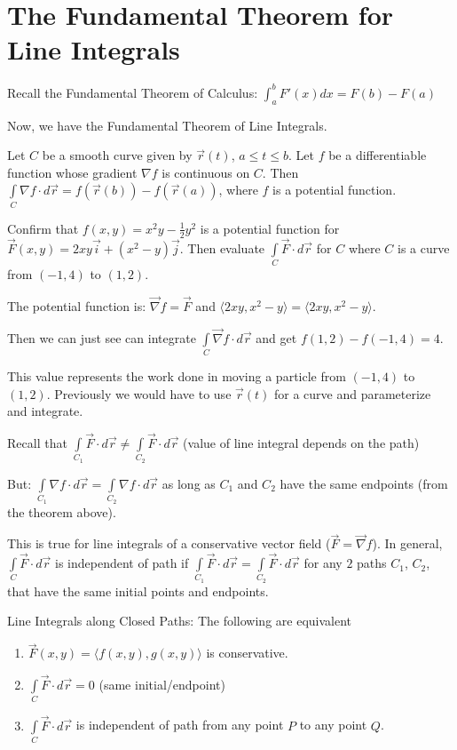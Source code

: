 \documentclass[../calc3.tex]{subfiles}
\begin{document}
\section{The Fundamental Theorem for Line Integrals}
Recall the Fundamental Theorem of Calculus: $\int_a^b F'(x)dx = F(b)-F(a)$

Now, we have the Fundamental Theorem of Line Integrals.
\begin{theorem}
    Let $C$ be a smooth curve given by $\vec{r}(t)$, $a\leq t\leq b$. Let $f$ be a differentiable function whose gradient $\nabla f$ is continuous on $C$. Then $\int\limits_{C} \nabla f \cdot d\vec{r}=f(\vec{r}(b))-f(\vec{r}(a))$, where $f$ is a potential function.
\end{theorem}

\begin{example}
    Confirm that $f(x,y)=x^2y-\frac{1}{2}y^2$ is a potential function for $\vec{F}(x,y)=2xy\vec{i}+(x^2-y)\vec{j}$. Then evaluate $\int\limits_{C}\vec{F} \cdot d\vec{r}$ for $C$ where $C$ is a curve from $(-1,4)$ to $(1,2)$.

    The potential function is: $\vec{\nabla}f=\vec{F}$ and $\langle 2xy,x^2-y\rangle = \langle 2xy,x^2-y\rangle$.

    Then we can just see can integrate $\int\limits_{C}\vec{\nabla}f\cdot d\vec{r}$ and get $f(1,2)-f(-1,4)=4$.

    This value represents the work done in moving a particle from $(-1,4)$ to $(1,2)$. Previously we would have to use $\vec{r}(t)$ for a curve and parameterize and integrate.
\end{example}

Recall that $\int\limits_{C_1}\vec{F}\cdot d\vec{r}\neq \int\limits_{C_2}\vec{F}\cdot d\vec{r}$ (value of line integral depends on the path)

But: $\int\limits_{C_1}\nabla f\cdot d\vec{r}=\int\limits_{C_2}\nabla f\cdot d\vec{r}$ as long as $C_1$ and $C_2$ have the same endpoints (from the theorem above).

This is true for line integrals of a conservative vector field ($\vec{F}=\vec{\nabla}f$). In general, $\int\limits_{C}\vec{F}\cdot d\vec{r}$ is independent of path if $\int\limits_{C_1}\vec{F}\cdot d\vec{r}=\int\limits_{C_2}\vec{F}\cdot d\vec{r}$ for any $2$ paths $C_1$, $C_2$, that have the same initial points and endpoints.

Line Integrals along Closed Paths: The following are equivalent
\begin{enumerate}
    \item $\vec{F}(x,y)=\langle f(x,y), g(x,y)\rangle$ is conservative. 
    \item $\int\limits_{C}\vec{F}\cdot d\vec{r}=0$ (same initial/endpoint)
    \item $\int\limits_{C}\vec{F}\cdot d\vec{r}$ is independent of path from any point $P$ to any point $Q$.
\end{enumerate}
\end{document}
